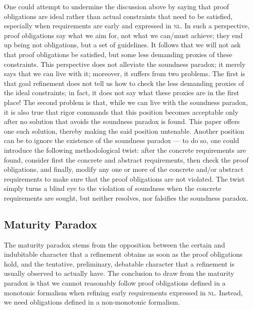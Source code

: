\documentclass[10pt, conference, compsocconf]{IEEEtran}
\begin{document}
One could attempt to undermine the discussion above by saying that proof obligations are ideal rather than actual constraints that need to be satisfied, especially when requirements are early and expressed in \textsc{nl}. In such a perspective, proof obligations say what we aim for, not what we can/must achieve; they end up being not obligations, but a set of guidelines. It follows that we will not ask that proof obligations be satisfied, but some less demanding proxies of these constraints. This perspective does not alleviate the soundness paradox; it merely says that we can live with it; moreover, it suffers from two problems. The first is that goal refinement does not tell us how to check the less demanding proxies of the ideal constraints; in fact, it does not say what these proxies are in the first place! The second problem is that, while we can live with the soundness paradox, it is also true that rigor commands that this position becomes acceptable only after no solution that avoids the soundness paradox is found. This paper offers one such solution, thereby making the said position untenable. Another position can be to ignore the existence of the soundness paradox --- to do so, one could introduce the following methodological twist: after the concrete requirements are found, consider first the concrete and abstract requirements, then check the proof obligations, and finally, modify any one or more of the concrete and/or abstract requirements to make sure that the proof obligations are not violated. The twist simply turns a blind eye to the violation of soundness when the concrete requirements are sought, but neither resolves, nor falsifies the soundness paradox.


\subsection{Maturity Paradox}\label{sect:paradoxes:maturity}
The maturity paradox stems from the opposition between the certain and indubitable character that a refinement obtains as soon as the proof obligations hold, and the tentative, preliminary, debatable character that a refinement is usually observed to actually have. The conclusion to draw from the maturity paradox is that we cannot reasonably follow proof obligations defined in a monotonic formalism when refining early requirements expressed in \textsc{nl}. Instead, we need obligations defined in a non-monotonic formalism. 
\end{document}

